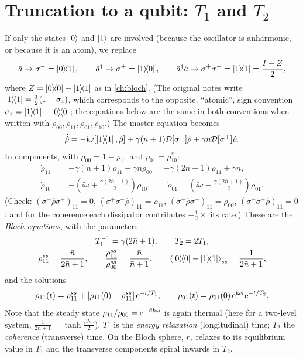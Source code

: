 \section{Truncation to a qubit: $T_1$ and $T_2$}
If only the states $\left|0\right\rangle$ and $\left|1\right\rangle$ are involved (because the oscillator is anharmonic, or because it is an atom), we replace
\begin{equation}
  \hat a\to\sigma^-=\left|0\middle\rangle\!\middle\langle1\right|,\qquad\hat a^\dagger\to\sigma^+=\left|1\middle\rangle\!\middle\langle0\right|,\qquad\hat a^\dagger\hat a\to\sigma^+\sigma^-=\left|1\middle\rangle\!\middle\langle1\right|=\frac{I-Z}2,
\end{equation}
where $Z=\left|0\middle\rangle\!\middle\langle0\right|-\left|1\middle\rangle\!\middle\langle1\right|$ as in \cref{ch:bloch}. (The original notes write $\left|1\middle\rangle\!\middle\langle1\right|=\frac12(1+\sigma_z)$, which corresponds to the opposite, ``atomic'', sign convention
$\sigma_z=\left|1\middle\rangle\!\middle\langle1\right|-\left|0\middle\rangle\!\middle\langle0\right|$; the equations below are the same in both conventions when written with $\rho_{00},\rho_{11},\rho_{01},\rho_{10}$.) The master equation becomes
\begin{equation}
  \dot{\hat\rho}=-\mathrm i\omega[\left|1\middle\rangle\!\middle\langle1\right|,\hat\rho]+\gamma(\bar n+1)\mathcal D[\sigma^-]\hat\rho+\gamma\bar n\mathcal D[\sigma^+]\hat\rho .
\end{equation}
In components, with $\rho_{00}=1-\rho_{11}$ and $\rho_{01}=\rho_{10}^*$:
\begin{align}
  \dot\rho_{11}&=-\gamma(\bar n+1)\rho_{11}+\gamma\bar n\rho_{00}=-\gamma(2\bar n+1)\rho_{11}+\gamma\bar n,\\
  \dot\rho_{10}&=-\left(\ii\omega+\frac{\gamma(2\bar n+1)}2\right)\rho_{10},\qquad\dot\rho_{01}=\left(\ii\omega-\frac{\gamma(2\bar n+1)}2\right)\rho_{01}.
\end{align}
(Check: $(\sigma^-\hat\rho\sigma^+)_{11}=0$, $(\sigma^+\sigma^-\hat\rho)_{11}=\rho_{11}$, $(\sigma^+\hat\rho\sigma^-)_{11}=\rho_{00}$, $(\sigma^-\sigma^+\hat\rho)_{11}=0$; and for the
coherence each dissipator contributes $-\frac12\times$ its rate.) These are the \emph{Bloch equations}, with the parameters
\begin{gather}
  T_1^{-1}=\gamma(2\bar n+1),\qquad T_2=2T_1,\\
  \rho_{11}^{ss}=\frac{\bar n}{2\bar n+1},\qquad\frac{\rho_{11}^{ss}}{\rho_{00}^{ss}}=\frac{\bar n}{\bar n+1},\qquad
  \left\langle\left|0\middle\rangle\!\middle\langle0\right|-\left|1\middle\rangle\!\middle\langle1\right|\right\rangle_{ss}=\frac1{2\bar n+1},
\end{gather}
and the solutions
\begin{equation}
  \rho_{11}(t)=\rho_{11}^{ss}+\left[\rho_{11}(0)-\rho_{11}^{ss}\right]\mathrm e^{-t/T_1},\qquad\rho_{01}(t)=\rho_{01}(0)\,\mathrm e^{\mathrm i\omega t}\mathrm e^{-t/T_2}.
\end{equation}
Note that the steady state $\rho_{11}/\rho_{00}=\mathrm e^{-\beta\hbar\omega}$ is again thermal (here for a two-level system, $\frac{1}{2\bar n+1}=\tanh\frac{\beta\hbar\omega}2$).
$T_1$ is the \emph{energy relaxation} (longitudinal) time; $T_2$ the \emph{coherence} (transverse) time. On the Bloch sphere, $r_z$ relaxes to its equilibrium value in $T_1$
and the transverse components spiral inwards in $T_2$.


